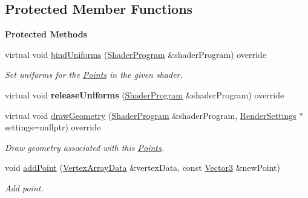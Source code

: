 \subsection*{Protected Member Functions}
\begin{Indent}\textbf{ Protected Methods}\par
\begin{DoxyCompactItemize}
\item 
\mbox{\label{classrev_1_1_points_a512380981b62e1fc37551c59f34fdae8}} 
virtual void \mbox{\hyperlink{classrev_1_1_points_a512380981b62e1fc37551c59f34fdae8}{bind\+Uniforms}} (\mbox{\hyperlink{classrev_1_1_shader_program}{Shader\+Program}} \&shader\+Program) override
\begin{DoxyCompactList}\small\item\em Set uniforms for the \mbox{\hyperlink{classrev_1_1_points}{Points}} in the given shader. \end{DoxyCompactList}\item 
\mbox{\label{classrev_1_1_points_a7bdebd8d2ed8f2a89374fa4e973501f2}} 
virtual void {\bfseries release\+Uniforms} (\mbox{\hyperlink{classrev_1_1_shader_program}{Shader\+Program}} \&shader\+Program) override
\item 
\mbox{\label{classrev_1_1_points_ac057f2e06f9ce2108fdb542c31010c58}} 
virtual void \mbox{\hyperlink{classrev_1_1_points_ac057f2e06f9ce2108fdb542c31010c58}{draw\+Geometry}} (\mbox{\hyperlink{classrev_1_1_shader_program}{Shader\+Program}} \&shader\+Program, \mbox{\hyperlink{classrev_1_1_render_settings}{Render\+Settings}} $\ast$settings=nullptr) override
\begin{DoxyCompactList}\small\item\em Draw geometry associated with this \mbox{\hyperlink{classrev_1_1_points}{Points}}. \end{DoxyCompactList}\item 
\mbox{\label{classrev_1_1_points_a4e603805a84a817b26e5d50794260e93}} 
void \mbox{\hyperlink{classrev_1_1_points_a4e603805a84a817b26e5d50794260e93}{add\+Point}} (\mbox{\hyperlink{classrev_1_1_vertex_array_data}{Vertex\+Array\+Data}} \&vertex\+Data, const \mbox{\hyperlink{classrev_1_1_vector}{Vector3}} \&new\+Point)
\begin{DoxyCompactList}\small\item\em Add point. \end{DoxyCompactList}\end{DoxyCompactItemize}
\end{Indent}
